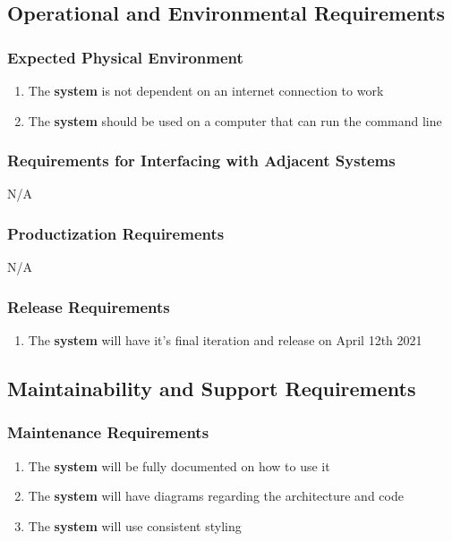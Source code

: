 \documentclass[12pt, titlepage]{article}
\begin{document}
\subsection{Operational and Environmental Requirements}
    \subsubsection{Expected Physical Environment}
        \begin{enumerate}
            \item The \textbf{system} is not dependent on an internet connection to work
            \item The \textbf{system} should be used on a computer that can run the command line
        \end{enumerate}
    \subsubsection{Requirements for Interfacing with Adjacent Systems}
        N/A
    \subsubsection{Productization Requirements}
        N/A
    \subsubsection{Release Requirements}
        \begin{enumerate}
            \item The \textbf{system} will have it's final iteration and release on April 12th 2021
        \end{enumerate}
\subsection{Maintainability and Support Requirements}
    \subsubsection{Maintenance Requirements}
        \begin{enumerate}
            \item The \textbf{system} will be fully documented on how to use it
            \item The \textbf{system} will have diagrams regarding the architecture and code
            \item The \textbf{system} will use consistent styling
        \end{enumerate}
\end{document}
